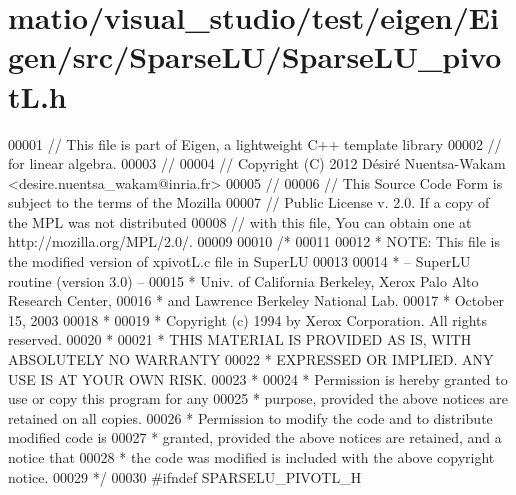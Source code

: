 \hypertarget{matio_2visual__studio_2test_2eigen_2_eigen_2src_2_sparse_l_u_2_sparse_l_u__pivot_l_8h_source}{}\section{matio/visual\+\_\+studio/test/eigen/\+Eigen/src/\+Sparse\+L\+U/\+Sparse\+L\+U\+\_\+pivotL.h}
\label{matio_2visual__studio_2test_2eigen_2_eigen_2src_2_sparse_l_u_2_sparse_l_u__pivot_l_8h_source}

\begin{DoxyCode}
00001 \textcolor{comment}{// This file is part of Eigen, a lightweight C++ template library}
00002 \textcolor{comment}{// for linear algebra.}
00003 \textcolor{comment}{//}
00004 \textcolor{comment}{// Copyright (C) 2012 Désiré Nuentsa-Wakam <desire.nuentsa\_wakam@inria.fr>}
00005 \textcolor{comment}{//}
00006 \textcolor{comment}{// This Source Code Form is subject to the terms of the Mozilla}
00007 \textcolor{comment}{// Public License v. 2.0. If a copy of the MPL was not distributed}
00008 \textcolor{comment}{// with this file, You can obtain one at http://mozilla.org/MPL/2.0/.}
00009 
00010 \textcolor{comment}{/* }
00011 \textcolor{comment}{ }
00012 \textcolor{comment}{ * NOTE: This file is the modified version of xpivotL.c file in SuperLU }
00013 \textcolor{comment}{ }
00014 \textcolor{comment}{ * -- SuperLU routine (version 3.0) --}
00015 \textcolor{comment}{ * Univ. of California Berkeley, Xerox Palo Alto Research Center,}
00016 \textcolor{comment}{ * and Lawrence Berkeley National Lab.}
00017 \textcolor{comment}{ * October 15, 2003}
00018 \textcolor{comment}{ *}
00019 \textcolor{comment}{ * Copyright (c) 1994 by Xerox Corporation.  All rights reserved.}
00020 \textcolor{comment}{ *}
00021 \textcolor{comment}{ * THIS MATERIAL IS PROVIDED AS IS, WITH ABSOLUTELY NO WARRANTY}
00022 \textcolor{comment}{ * EXPRESSED OR IMPLIED.  ANY USE IS AT YOUR OWN RISK.}
00023 \textcolor{comment}{ *}
00024 \textcolor{comment}{ * Permission is hereby granted to use or copy this program for any}
00025 \textcolor{comment}{ * purpose, provided the above notices are retained on all copies.}
00026 \textcolor{comment}{ * Permission to modify the code and to distribute modified code is}
00027 \textcolor{comment}{ * granted, provided the above notices are retained, and a notice that}
00028 \textcolor{comment}{ * the code was modified is included with the above copyright notice.}
00029 \textcolor{comment}{ */}
00030 \textcolor{preprocessor}{#ifndef SPARSELU\_PIVOTL\_H}

\end{DoxyCode}
